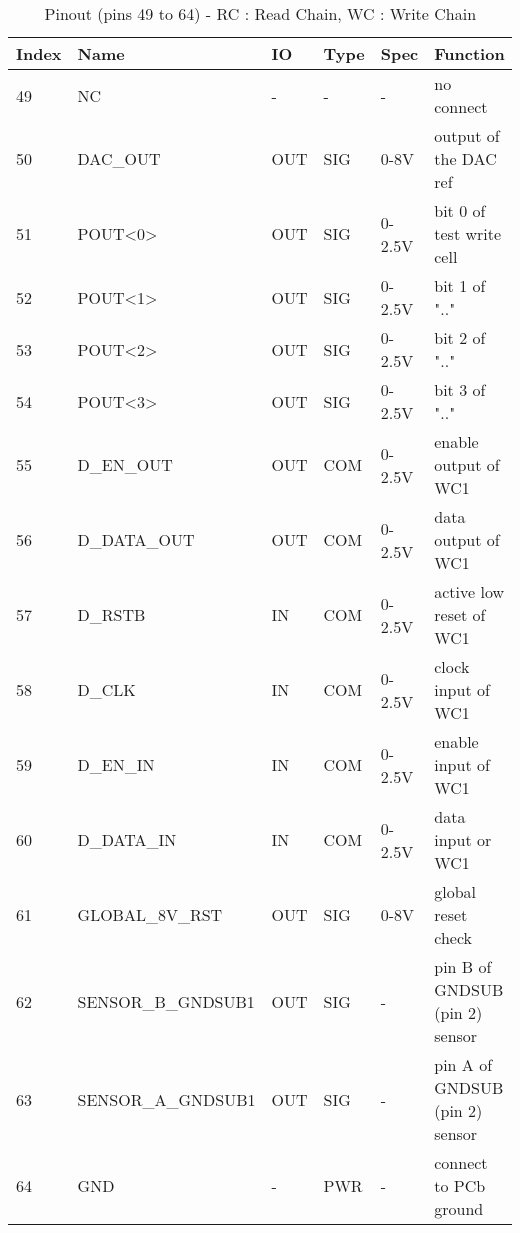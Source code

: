 \begin{table}[!htbp]
\centering
\begin{tabular}{@{}llllll@{}}
\toprule
Index & Name           & IO  & Type  & Spec   & Function                                                          \\ \toprule
49 & NC	               & -   & -	   & -      & no connect                                                     \\
50 & DAC\_OUT	         & OUT & SIG	 & 0-8V   & output of the DAC ref        \\
51 & POUT<0>	         & OUT & SIG	 & 0-2.5V	& bit 0 of test write cell                    \\
52 & POUT<1>	         & OUT & SIG	 & 0-2.5V	& bit 1 of ".."                      \\
53 & POUT<2>	         & OUT & SIG	 & 0-2.5V	& bit 2 of ".."                      \\
54 & POUT<3>           & OUT & SIG	 & 0-2.5V	& bit 3 of ".."                       \\
55 & D\_EN\_OUT	       & OUT & COM	 & 0-2.5V	& enable output of WC1     \\
56 & D\_DATA\_OUT      & OUT & COM	 & 0-2.5V	& data output of WC1   \\
57 & D\_RSTB           & IN	 & COM	 & 0-2.5V	& active low reset of WC1    \\
58 & D\_CLK	           & IN	 & COM	 & 0-2.5V	& clock input of WC1         \\
59 & D\_EN\_IN         & IN	 & COM	 & 0-2.5V	& enable input of WC1       \\
60 & D\_DATA\_IN       & IN	 & COM	 & 0-2.5V	& data input or WC1             \\
61 & GLOBAL\_8V\_RST   & OUT & SIG	 & 0-8V	  & global reset check             \\
62 & SENSOR\_B\_GNDSUB1& OUT & SIG	 & -      & pin B of GNDSUB (pin 2) sensor           \\
63 & SENSOR\_A\_GNDSUB1& OUT & SIG	 & -      & pin A of GNDSUB (pin 2) sensor          \\
64 & GND	             & -	 & PWR	 & -      & connect to PCb ground          \\
\bottomrule
\end{tabular}
\caption{Pinout (pins 49 to 64) - RC : Read Chain, WC : Write Chain}
\label{tab:testchip-pinout-4}
\end{table}
